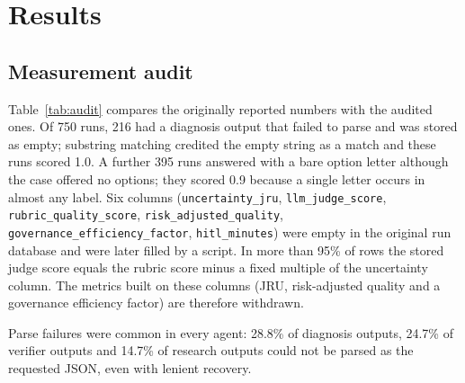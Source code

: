 \documentclass[conference]{IEEEtran}
\begin{document}
\section{Results}
\subsection{Measurement audit}
\label{sec:audit}
Table~\ref{tab:audit} compares the originally reported numbers with the audited ones. Of 750 runs, 216 had a
diagnosis output that failed to parse and was stored as empty; substring matching credited the empty string as a
match and these runs scored 1.0. A further 395 runs answered with a bare option letter although the case offered
no options; they scored 0.9 because a single letter occurs in almost any label. Six columns
(\texttt{uncertainty\_jru}, \texttt{llm\_judge\_score}, \texttt{rubric\_quality\_score},
\texttt{risk\_adjusted\_quality}, \texttt{governance\_efficiency\_factor}, \texttt{hitl\_minutes}) were empty in the
original run database and were later filled by a script. In more than 95\% of rows the stored judge score equals the
rubric score minus a fixed multiple of the uncertainty column. The metrics built on these columns (JRU,
risk-adjusted quality and a governance efficiency factor) are therefore withdrawn.

\begin{table}[htbp]
\centering
\caption{Originally reported versus audited values}
\label{tab:audit}
\end{table}

Parse failures were common in every agent: 28.8\% of diagnosis outputs, 24.7\% of verifier outputs and 14.7\% of
research outputs could not be parsed as the requested JSON, even with lenient recovery.
\end{document}

